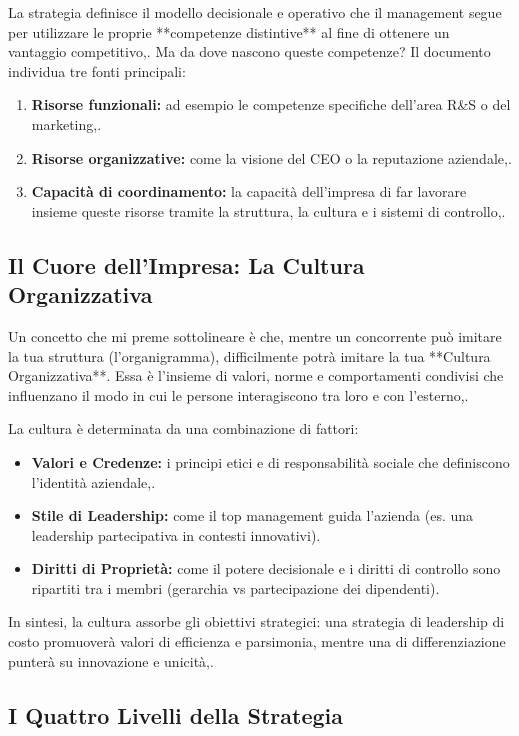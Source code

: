 \documentclass[a4paper,10pt]{article}
\begin{document}
La strategia definisce il modello decisionale e operativo che il management segue per utilizzare le proprie **competenze distintive** al fine di ottenere un vantaggio competitivo,. Ma da dove nascono queste competenze? Il documento individua tre fonti principali:
\begin{enumerate}
    \item \textbf{Risorse funzionali:} ad esempio le competenze specifiche dell'area R\&S o del marketing,.
    \item \textbf{Risorse organizzative:} come la visione del CEO o la reputazione aziendale,.
    \item \textbf{Capacità di coordinamento:} la capacità dell'impresa di far lavorare insieme queste risorse tramite la struttura, la cultura e i sistemi di controllo,.
\end{enumerate}

\subsection*{Il Cuore dell'Impresa: La Cultura Organizzativa}

Un concetto che mi preme sottolineare è che, mentre un concorrente può imitare la tua struttura (l'organigramma), difficilmente potrà imitare la tua **Cultura Organizzativa**. Essa è l'insieme di valori, norme e comportamenti condivisi che influenzano il modo in cui le persone interagiscono tra loro e con l'esterno,. 

La cultura è determinata da una combinazione di fattori:
\begin{itemize}
    \item \textbf{Valori e Credenze:} i principi etici e di responsabilità sociale che definiscono l'identità aziendale,.
    \item \textbf{Stile di Leadership:} come il top management guida l'azienda (es. una leadership partecipativa in contesti innovativi).
    \item \textbf{Diritti di Proprietà:} come il potere decisionale e i diritti di controllo sono ripartiti tra i membri (gerarchia vs partecipazione dei dipendenti).
\end{itemize}
In sintesi, la cultura assorbe gli obiettivi strategici: una strategia di leadership di costo promuoverà valori di efficienza e parsimonia, mentre una di differenziazione punterà su innovazione e unicità,.

\subsection*{I Quattro Livelli della Strategia}
\end{document}
